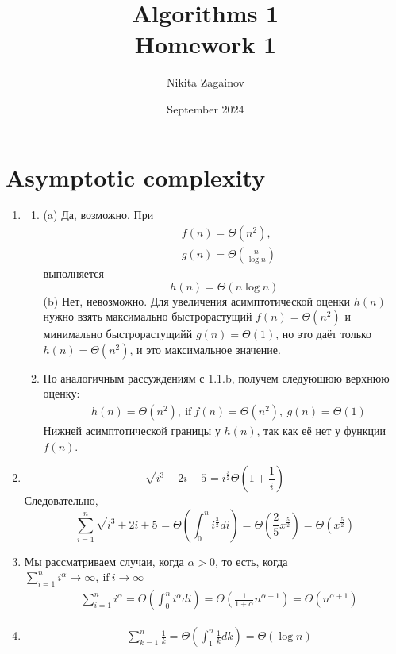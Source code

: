 \documentclass{article}
\title{Algorithms 1 \\ Homework 1}
\author{Nikita Zagainov}
\date{September 2024}
\begin{document}
\maketitle
\section{Asymptotic complexity}
\begin{enumerate}
    \item
          \begin{enumerate}
              \item[1.]
                  (a) Да, возможно. При
                  \begin{align*}
                       & f(n) = \Theta(n^2),              \\
                       & g(n) = \Theta(\frac{n}{\log{n}})
                  \end{align*}
                  выполняется
                  \[
                      h(n) = \Theta{(n\log{n})}
                  \]
                  (b) Нет, невозможно. Для увеличения асимптотической оценки $h(n)$ нужно взять максимально быстрорастущий $f(n) = \Theta(n^2)$ и минимально быстрорастущийй $g(n) = \Theta(1)$, но это даёт только $h(n) = \Theta(n^2)$, и это максимальное значение.
              \item[2.]
                  По аналогичным рассуждениям с 1.1.b, получем следующюю верхнюю оценку:
                  \begin{align*}
                       & h(n) = \Theta(n^2), \ \text{if} \ f(n) = \Theta(n^2), \ g(n) = \Theta(1)
                  \end{align*}
                  Нижней асимптотической границы у $h(n)$, так как её нет у функции $f(n)$.
          \end{enumerate}
    \item
          \[
              \sqrt{i^3 + 2i + 5} = i^{\frac{3}{2}}\Theta(1 + \frac{1}{i})
          \]
          Следовательно,
          \[
              \sum_{i=1}^{n}{\sqrt{i^3 + 2i + 5}} = \Theta{(\int_0^n{i^{\frac{3}{2}}di})} = \Theta(\frac{2}{5}x^{\frac{5}{2}}) = \Theta(x^{\frac{5}{2}})
          \]
    \item
          Мы рассматриваем случаи, когда $\alpha > 0$, то есть, когда $\sum_{i=1}^{n}{i^{\alpha}} \to \infty, \ \text{if} \ i \to \infty$
          \begin{align*}
               & \sum_{i=1}^{n}{i^{\alpha}} = \Theta(\int_0^n{i^{\alpha} di}) = \Theta(\frac{1}{1 + \alpha}n^{\alpha + 1}) = \Theta(n^{\alpha + 1})
          \end{align*}

    \item
          \begin{align*}
               & \sum_{k=1}^{n}{\frac{1}{k}} = \Theta(\int_1^n{\frac{1}{k} dk}) = \Theta(\log{n})
          \end{align*}
\end{enumerate}
\end{document}
